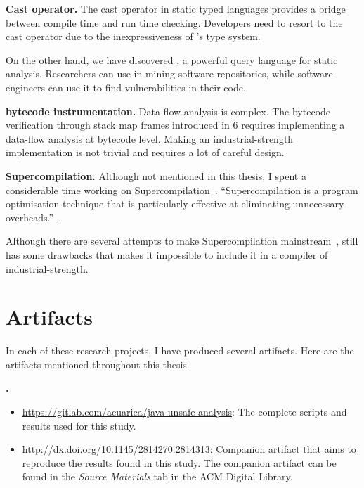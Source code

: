 \textbf{Cast operator.}
The cast operator in static typed languages provides a bridge between compile time and run time checking.
Developers need to resort to the cast operator due to the inexpressiveness of \java{}'s type system. 

On the other hand, we have discovered \ql{},
a powerful query language for static analysis.
Researchers can use \ql{} in mining software repositories,
while software engineers can use it to find vulnerabilities in their code.

\textbf{\java{} bytecode instrumentation.}
Data-flow analysis is complex.
The bytecode verification through stack map frames introduced in \java{} 6 requires implementing a data-flow analysis at bytecode level.
Making an industrial-strength implementation is not trivial
and requires a lot of careful design.

\textbf{Supercompilation.}
Although not mentioned in this thesis,
I spent a considerable time working on Supercompilation~\citep{turchinConceptSupercompiler1986}.
``Supercompilation is a program optimisation technique that is particularly effective at eliminating unnecessary overheads.''~\citep{mitchellRethinkingSupercompilation2010}.

Although there are several attempts to make Supercompilation mainstream~\citep{mitchellSupercompilerCoreHaskell2007,bolingbrokeSupercompilationEvaluation2010},
still has some drawbacks that makes it impossible to include it in a compiler of industrial-strength.


\section{Artifacts}
\newcommand{\urlartifact}[2]{\item{\footnotesize\url{#1}}: #2}

In each of these research projects,
I have produced several artifacts.
Here are the artifacts mentioned throughout this thesis.

\textbf{\unsafe{} \api{}.}
\begin{itemize}
\urlartifact{https://gitlab.com/acuarica/java-unsafe-analysis}{The complete scripts and results used for this study.}
\urlartifact{http://dx.doi.org/10.1145/2814270.2814313}{Companion artifact that aims to reproduce the results found in this study.
The companion artifact can be found in the \emph{Source Materials} tab in the ACM Digital Library.}
\end{itemize}

